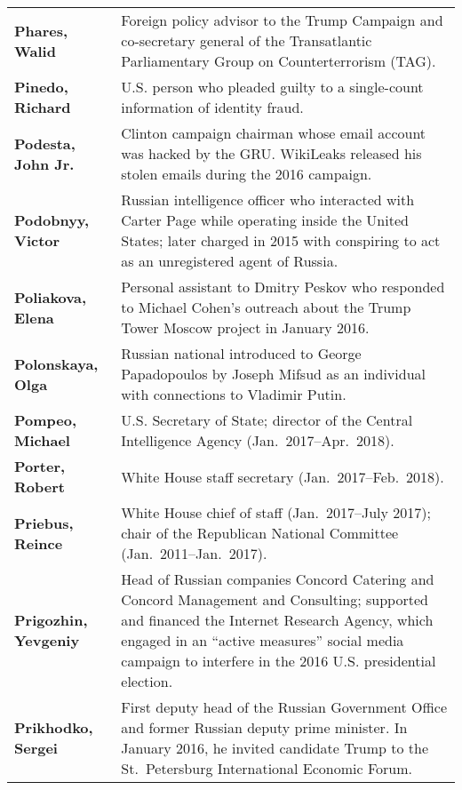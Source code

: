 \begin{longtable}{ p{} p{} }
    \textbf{Phares, Walid} & Foreign policy advisor to the Trump Campaign and co-secretary general of the Transatlantic Parliamentary Group on Counterterrorism (TAG). \\

    \textbf{Pinedo, Richard} & U.S. person who pleaded guilty to a single-count information of identity fraud. \\

    \textbf{Podesta, John Jr.} & Clinton campaign chairman whose email account was hacked by the GRU\null. WikiLeaks released his stolen emails during the 2016 campaign. \\

    \textbf{Podobnyy, Victor} & Russian intelligence officer who interacted with Carter Page while operating inside the United States; later charged in 2015 with conspiring to act as an unregistered agent of Russia. \\

    \textbf{Poliakova, Elena} & Personal assistant to Dmitry Peskov who responded to Michael Cohen's outreach about the Trump Tower Moscow project in January 2016. \\

    \textbf{Polonskaya, Olga} & Russian national introduced to George Papadopoulos by Joseph Mifsud as an individual with connections to Vladimir Putin. \\

    \textbf{Pompeo, Michael} & U.S. Secretary of State; director of the Central Intelligence Agency (Jan.~2017--Apr.~2018). \\

    \textbf{Porter, Robert} & White House staff secretary (Jan.~2017--Feb.~2018). \\

    \textbf{Priebus, Reince} & White House chief of staff (Jan.~2017--July 2017); chair of the Republican National Committee (Jan.~2011--Jan.~2017). \\

    \textbf{Prigozhin, Yevgeniy} & Head of Russian companies Concord Catering and Concord Management and Consulting; supported and financed the Internet Research Agency, which engaged in an ``active measures'' social media campaign to interfere in the 2016 U.S. presidential election. \\

    \textbf{Prikhodko, Sergei} & First deputy head of the Russian Government Office and former Russian deputy prime minister. In January 2016, he invited candidate Trump to the St.~Petersburg International Economic Forum. \\


\end{longtable}
